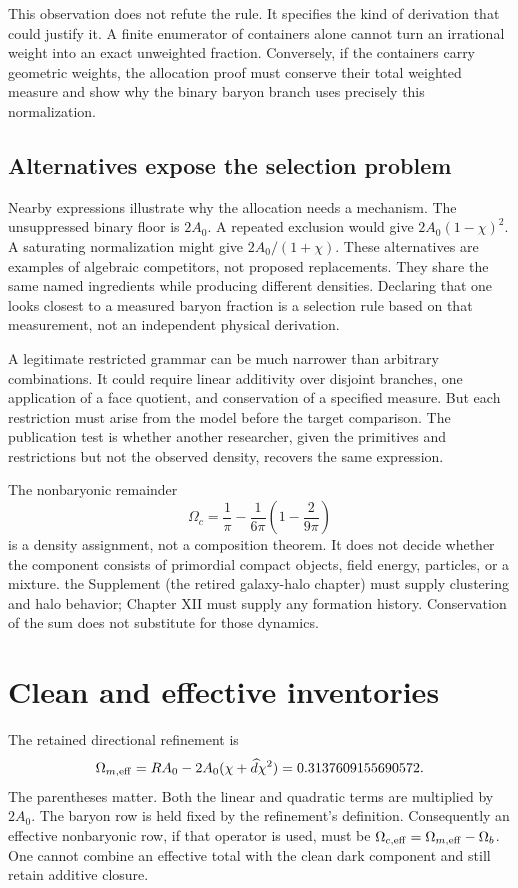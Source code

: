 This observation does not refute the rule. It specifies the kind of derivation that could justify it. A finite enumerator of containers alone cannot turn an irrational weight into an exact unweighted fraction. Conversely, if the containers carry geometric weights, the allocation proof must conserve their total weighted measure and show why the binary baryon branch uses precisely this normalization.

\subsection{Alternatives expose the selection problem}
Nearby expressions illustrate why the allocation needs a mechanism. The unsuppressed binary floor is $2A_0$. A repeated exclusion would give $2A_0(1-\chi)^2$. A saturating normalization might give $2A_0/(1+\chi)$. These alternatives are examples of algebraic competitors, not proposed replacements. They share the same named ingredients while producing different densities. Declaring that one looks closest to a measured baryon fraction is a selection rule based on that measurement, not an independent physical derivation.

A legitimate restricted grammar can be much narrower than arbitrary combinations. It could require linear additivity over disjoint branches, one application of a face quotient, and conservation of a specified measure. But each restriction must arise from the model before the target comparison. The publication test is whether another researcher, given the primitives and restrictions but not the observed density, recovers the same expression.

The nonbaryonic remainder
\begin{equation}
 \Omega_c=\frac1\pi-\frac1{6\pi}
 \left(1-\frac2{9\pi}\right)
 \label{c8:nonbaryon}
\end{equation}
is a density assignment, not a composition theorem. It does not decide whether the component consists of primordial compact objects, field energy, particles, or a mixture. the Supplement (the retired galaxy-halo chapter) must supply clustering and halo behavior; Chapter XII must supply any formation history. Conservation of the sum does not substitute for those dynamics.

\section{Clean and effective inventories}
The retained directional refinement is
\begin{equation}
 \Omega_{m,\rm eff}=RA_0-2A_0(\chi+\widehat d\chi^2)
 =0.3137609155690572.
 \label{c8:effective}
\end{equation}
The parentheses matter. Both the linear and quadratic terms are multiplied by $2A_0$. The baryon row is held fixed by the refinement's definition. Consequently an effective nonbaryonic row, if that operator is used, must be $\Omega_{c,\rm eff}=\Omega_{m,\rm eff}-\Omega_b$. One cannot combine an effective total with the clean dark component and still retain additive closure.

